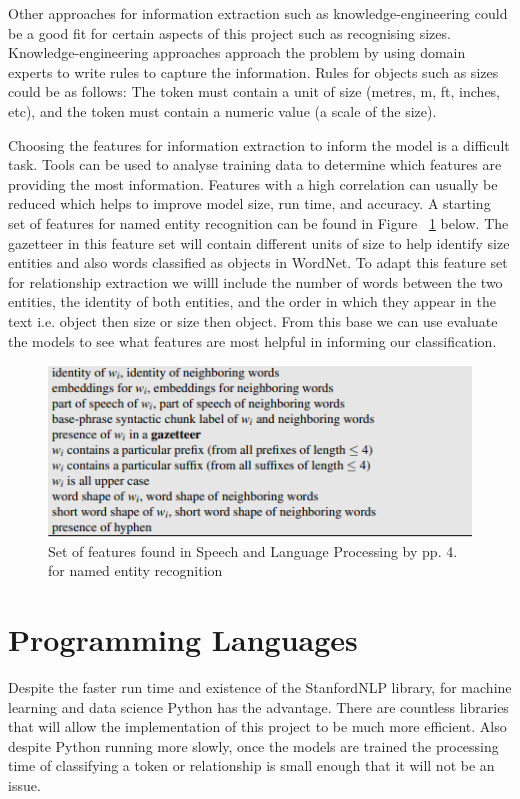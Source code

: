 \documentclass[11pt,oneside]{book}
\begin{document}
Other approaches for information extraction such as knowledge-engineering could be a good fit for certain aspects of this project such as recognising sizes. Knowledge-engineering approaches approach the problem by using domain experts to write rules to capture the information. Rules for objects such as sizes could be as follows: The token must contain a unit of size (metres, m, ft, inches, etc), and the token must contain a numeric value (a scale of the size).

Choosing the features for information extraction to inform the model is a difficult task. Tools can be used to analyse training data to determine which features are providing the most information. Features with a high correlation can usually be reduced which helps to improve model size, run time, and accuracy. A starting set of features for named entity recognition can be found in Figure ~\ref{fig:feature_set} below. The gazetteer in this feature set will contain different units of size to help identify size entities and also words classified as objects in WordNet. To adapt this feature set for relationship extraction we willl include the number of words between the two entities, the identity of both entities, and the order in which they appear in the text i.e. object then size or size then object. From this base we can use evaluate the models to see what features are most helpful in informing our classification.

\begin{figure}[!htbp]
\centering
\includegraphics[scale=1]{figures/features.png}
\caption{Set of features found in Speech and Language Processing by \cite{reference1} pp. 4. for named entity recognition}
\label{fig:feature_set}
\end{figure}

\section{Programming Languages}
Despite the faster run time and existence of the StanfordNLP library, for machine learning and data science Python has the advantage. There are countless libraries that will allow the implementation of this project to be much more efficient. Also despite Python running more slowly, once the models are trained the processing time of classifying a token or relationship is small enough that it will not be an issue.
\end{document}
